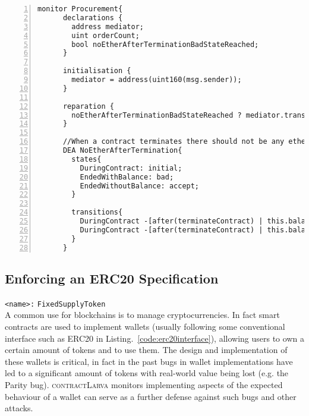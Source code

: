 \documentclass{article}
\newcommand{\contractlarva}{\textsc{contractLarva}\xspace}
\newcommand{\tildearrow}{{\raise.37ex\hbox{$\scriptstyle\mathtt{\sim}$}}\hspace{-0.08cm}>\xspace}
\begin{document}
    \small\begin{lstlisting}[language=DEA,basicstyle=\scriptsize,numbers=left,numbersep=2pt,xleftmargin=0.3cm,escapechar=\%,label={dea:courierservice2}]
    monitor Procurement{
      declarations {
        address mediator;
        uint orderCount;
        bool noEtherAfterTerminationBadStateReached;
      }
    
      initialisation {
        mediator = address(uint160(msg.sender));
      }
    
      reparation {
        noEtherAfterTerminationBadStateReached ? mediator.transfer(this.balance) : (); 
      }
    
      //When a contract terminates there should not be any ether left in its balance.
      DEA NoEtherAfterTermination{
        states{
          DuringContract: initial;
          EndedWithBalance: bad;
          EndedWithoutBalance: accept;
        }
    
        transitions{
          DuringContract -[after(terminateContract) | this.balance != 0 %$\tildearrow$% noEtherAfterTerminationBadStateReached = true;]-> EndedWithBalance;
          DuringContract -[after(terminateContract) | this.balance == 0]-> EndedWithoutBalance;
        }
      }
        \end{lstlisting}\normalsize
    

   \subsection{Enforcing an ERC20 Specification}
   
          \texttt{<name>:} \verb+FixedSupplyToken+\\
   
   A common use for blockchains is to manage cryptocurrencies. In fact smart contracts are used to implement wallets (usually following some conventional interface such as ERC20 in Listing.~\ref{code:erc20interface}), allowing users to own a certain amount of tokens and to use them. The design and implementation of these wallets is critical, in fact in the past bugs in wallet implementations have led to a significant amount of tokens with real-world value being lost (e.g. the Parity bug). \contractlarva monitors implementing aspects of the expected behaviour of a wallet can serve as a further defense against such bugs and other attacks.
   
\end{document}
